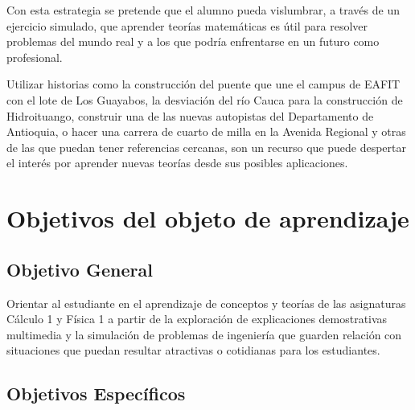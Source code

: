 \documentclass[twoside,letterpaper,11pt]{report}
\begin{document}
Con esta estrategia se pretende que el alumno pueda vislumbrar, a través de un ejercicio simulado, que aprender teorías matemáticas es útil para resolver problemas del mundo real y a los que podría enfrentarse en un futuro como profesional.

Utilizar historias como la construcción del puente que une el campus de EAFIT con el lote de Los Guayabos, la desviación del río Cauca para la construcción de Hidroituango, construir una de las nuevas autopistas del Departamento de Antioquia, o hacer una carrera de cuarto de milla en la Avenida Regional y otras de las que puedan tener referencias cercanas, son un recurso que puede despertar el interés por aprender nuevas teorías desde sus posibles aplicaciones.  






\section{Objetivos del objeto de aprendizaje} %
\label{sec:objetivos_del_objeto_de_aprendizaje}

\subsection{Objetivo General} %
\label{sub:objetivo_general}

Orientar al estudiante en el aprendizaje de conceptos y teorías de las asignaturas Cálculo 1 y Física 1 a partir de la exploración de explicaciones demostrativas multimedia y la simulación de problemas de ingeniería que guarden relación con situaciones que puedan resultar atractivas o cotidianas para los estudiantes.


\subsection{ Objetivos Específicos} %
\label{sub:_objetivos_espec_ficos}
\end{document}
